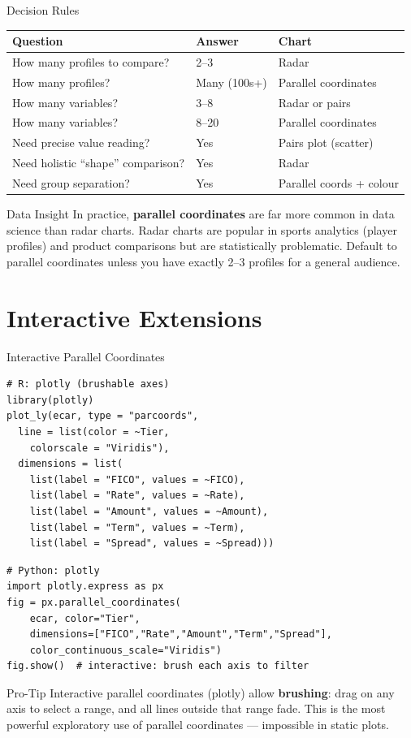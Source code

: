 \documentclass[10pt]{beamer}
\begin{document}
\begin{frame}{Decision Rules}
  \centering
  \begin{tabular}{lll}
    \toprule
    \textbf{Question} & \textbf{Answer} & \textbf{Chart} \\
    \midrule
    How many profiles to compare? & 2--3 & Radar \\
    How many profiles? & Many (100s+) & Parallel coordinates \\
    How many variables? & 3--8 & Radar or pairs \\
    How many variables? & 8--20 & Parallel coordinates \\
    Need precise value reading? & Yes & Pairs plot (scatter) \\
    Need holistic ``shape'' comparison? & Yes & Radar \\
    Need group separation? & Yes & Parallel coords + colour \\
    \bottomrule
  \end{tabular}
  \vspace{6pt}
  \begin{exampleblock}{Data Insight}
    In practice, \textbf{parallel coordinates} are far more common in
    data science than radar charts. Radar charts are popular in sports
    analytics (player profiles) and product comparisons but are
    statistically problematic. Default to parallel coordinates unless
    you have exactly 2--3 profiles for a general audience.
  \end{exampleblock}
\end{frame}

\section{Interactive Extensions}

\begin{frame}[fragile]{Interactive Parallel Coordinates}
\begin{lstlisting}[style=rstyle]
# R: plotly (brushable axes)
library(plotly)
plot_ly(ecar, type = "parcoords",
  line = list(color = ~Tier,
    colorscale = "Viridis"),
  dimensions = list(
    list(label = "FICO", values = ~FICO),
    list(label = "Rate", values = ~Rate),
    list(label = "Amount", values = ~Amount),
    list(label = "Term", values = ~Term),
    list(label = "Spread", values = ~Spread)))
\end{lstlisting}
\begin{lstlisting}[style=pythonstyle]
# Python: plotly
import plotly.express as px
fig = px.parallel_coordinates(
    ecar, color="Tier",
    dimensions=["FICO","Rate","Amount","Term","Spread"],
    color_continuous_scale="Viridis")
fig.show()  # interactive: brush each axis to filter
\end{lstlisting}
  \begin{alertblock}{Pro-Tip}
    Interactive parallel coordinates (plotly) allow \textbf{brushing}:
    drag on any axis to select a range, and all lines outside that
    range fade. This is the most powerful exploratory use of parallel
    coordinates --- impossible in static plots.
  \end{alertblock}
\end{frame}
\end{document}
